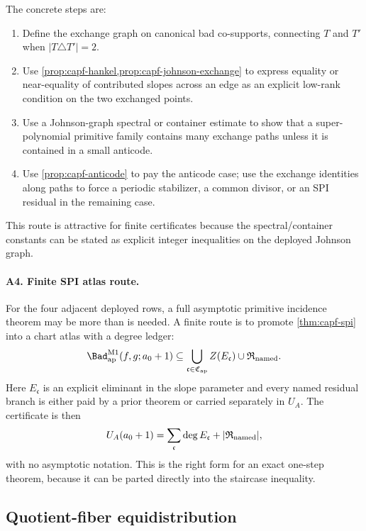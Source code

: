 \documentclass[11pt]{article}
\theoremstyle{definition}
\theoremstyle{remark}
\begin{document}
The concrete steps are:
\begin{enumerate}[label=\textup{A3.\arabic*},leftmargin=3.0em]
\item Define the exchange graph on canonical bad co-supports, connecting $T$ and $T'$ when $|T\triangle T'|=2$.
\item Use \cref{prop:capf-hankel,prop:capf-johnson-exchange} to express equality or near-equality of contributed slopes across an edge as an explicit low-rank condition on the two exchanged points.
\item Use a Johnson-graph spectral or container estimate to show that a super-polynomial primitive family contains many exchange paths unless it is contained in a small anticode.
\item Use \cref{prop:capf-anticode} to pay the anticode case; use the exchange identities along paths to force a periodic stabilizer, a common divisor, or an SPI residual in the remaining case.
\end{enumerate}

This route is attractive for finite certificates because the spectral/container constants can be stated as explicit integer inequalities on the deployed Johnson graph.

\paragraph{A4. Finite SPI atlas route.}
For the four adjacent deployed rows, a full asymptotic primitive incidence theorem may be more than is needed.  A finite route is to promote \cref{thm:capf-spi} into a chart atlas with a degree ledger:
\[
        \Bad_{\rm ap}^{\rm M1}(f,g;a_0+1)
        \subseteq
        \bigcup_{\mathfrak c\in\mathfrak C_{\rm ap}} Z(E_{\mathfrak c})
        \cup \mathfrak R_{\rm named} .
\]
Here $E_{\mathfrak c}$ is an explicit eliminant in the slope parameter and every named residual branch is either paid by a prior theorem or carried separately in $U_A$.  The certificate is then
\[
        U_A(a_0+1)=\sum_{\mathfrak c}\deg E_{\mathfrak c}+|\mathfrak R_{\rm named}|,
\]
with no asymptotic notation.  This is the right form for an exact one-step theorem, because it can be parted directly into the staircase inequality.

\subsection{Quotient-fiber equidistribution}\label{subsec:capfaq-Q-strategies}
\end{document}
